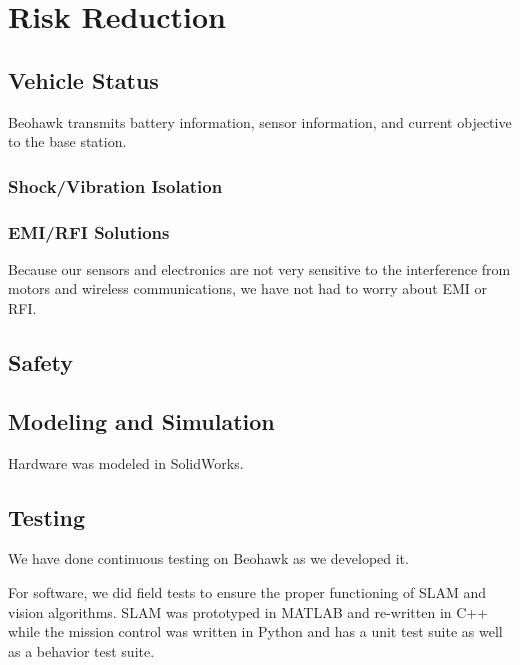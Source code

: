 \documentclass[12pt, letterpaper]{article}
\begin{document}
\section{Risk Reduction}
\subsection{Vehicle Status}
Beohawk transmits battery information, sensor information, and current objective to the base station. 

\subsubsection{Shock/Vibration Isolation}

\subsubsection{EMI/RFI Solutions}
Because our sensors and electronics are not very sensitive to the interference from motors and wireless communications, we have not had to worry about EMI or RFI.

\subsection{Safety}

\subsection{Modeling and Simulation}
Hardware was modeled in SolidWorks.

\subsection{Testing}
We have done continuous testing on Beohawk as we developed it. 

For software, we did field tests to ensure the proper functioning of SLAM and vision algorithms.  SLAM was prototyped in MATLAB and re-written in C++ while the mission control was written in Python and has a unit test suite as well as a behavior test suite. 
\end{document}
